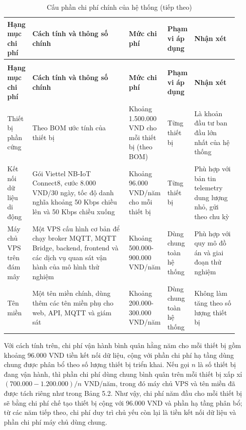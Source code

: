 \documentclass[a4paper]{extarticle}
\newcommand{\thesissettableid}[2]{%
  \renewcommand{\thetable}{#1}%
  \renewcommand{\theHtable}{#2}%
}
\begin{document}
{\thesissettableid{5.2}{condensed-bang-5-2-cau-phan-chi-phi-chinh-cua-he-thong}
\def\LTcaptype{table}
\begin{longtable}{|L{0.085\linewidth}|L{0.429\linewidth}|L{0.151\linewidth}|L{0.08\linewidth}|L{0.199\linewidth}|}
\caption{Cấu phần chi phí chính của hệ thống}\label{tab:condensed-bang-5-2-cau-phan-chi-phi-chinh-cua-he-thong}\\
\hline
\textbf{Hạng mục chi phí} & \textbf{Cách tính và thông số chính} & \textbf{Mức chi phí} & \textbf{Phạm vi áp dụng} & \textbf{Nhận xét} \\
\hline
\endfirsthead
\caption[]{Cấu phần chi phí chính của hệ thống (tiếp theo)}\\
\hline
\textbf{Hạng mục chi phí} & \textbf{Cách tính và thông số chính} & \textbf{Mức chi phí} & \textbf{Phạm vi áp dụng} & \textbf{Nhận xét} \\
\hline
\endhead
\endfoot
\endlastfoot
Thiết bị phần cứng & Theo BOM ước tính của thiết bị & Khoảng 1.500.000 VND cho mỗi thiết bị (theo BOM) & Từng thiết bị & Là khoản đầu tư ban đầu lớn nhất của hệ thống \\\hline
Kết nối dữ liệu di động & Gói Viettel NB-IoT Connect8, cước 8.000 VND/30 ngày, tốc độ danh nghĩa khoảng 50 Kbps chiều lên và 50 Kbps chiều xuống & Khoảng 96.000 VND/năm cho mỗi thiết bị & Từng thiết bị & Phù hợp với bản tin telemetry dung lượng nhỏ, gửi theo chu kỳ \\\hline
Máy chủ VPS trên đám mây & Một VPS cấu hình cơ bản để chạy broker MQTT, MQTT Bridge, backend, frontend và các dịch vụ quan sát vận hành của mô hình thử nghiệm & Khoảng 500.000-900.000 VND/năm & Dùng chung toàn hệ thống & Phù hợp với quy mô đồ án và giai đoạn thử nghiệm \\\hline
Tên miền & Một tên miền chính, dùng thêm các tên miền phụ cho web, API, MQTT và giám sát & Khoảng 200.000-300.000 VND/năm & Dùng chung toàn hệ thống & Không làm tăng theo số lượng thiết bị \\\hline
\end{longtable}
}

Với cách tính trên, chi phí vận hành bình quân hằng năm cho mỗi thiết bị gồm
khoảng 96.000 VND tiền kết nối dữ liệu, cộng với phần chi phí hạ tầng dùng chung
được phân bổ theo số lượng thiết bị triển khai. Nếu gọi \(n\) là số thiết bị đang
vận hành, thì phần chi phí dùng chung bình quân trên mỗi thiết bị xấp xỉ
\((700.000-1.200.000)/n\) VND/năm, trong đó máy chủ VPS và tên miền đã được tách
riêng như trong Bảng 5.2. Như vậy, chi phí năm đầu cho mỗi thiết bị sẽ bằng chi
phí chế tạo thiết bị cộng với 96.000 VND và phần hạ tầng phân bổ; từ các
năm tiếp theo, chi phí duy trì chủ yếu còn lại là tiền kết nối dữ liệu và phần
chi phí máy chủ dùng chung.
\end{document}
